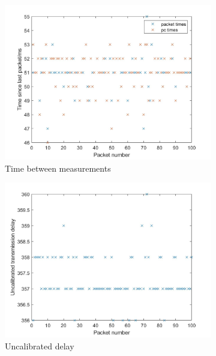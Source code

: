 \documentclass[twoside,twocolumn,12pt]{article}
\begin{document}
\begin{figure}[hb!]
  \centering
  \begin{subfigure}[t]{0.325\textwidth}
    \includegraphics[width=\linewidth]{timestep}
   \caption{Time between measurements}
  \label{fig:ts}
  \end{subfigure}
  \begin{subfigure}[t]{0.325\textwidth}
    \includegraphics[width=\linewidth]{delay}
    \caption{Uncalibrated delay}
  \label{fig:td}
  \end{subfigure}
  \begin{subfigure}[t]{0.325\textwidth}

\end{subfigure}
\end{figure}
\end{document}
